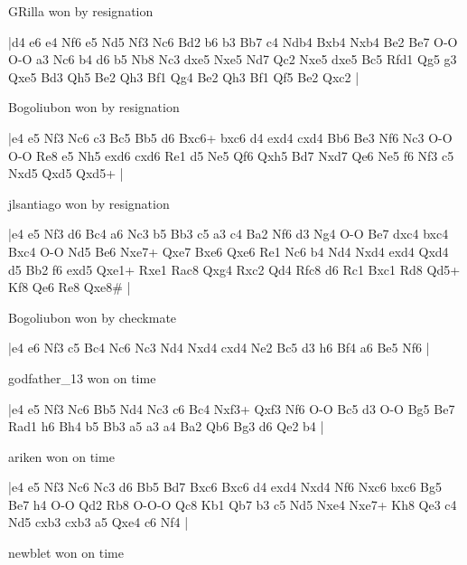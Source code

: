 GRilla won by resignation

\makegametitle
|d4 e6 e4 Nf6 e5 Nd5 Nf3 Nc6 Bd2 b6 b3 Bb7 c4 Ndb4 Bxb4 Nxb4 Be2 Be7 O-O O-O a3 Nc6 b4 d6 b5 Nb8 Nc3 dxe5 Nxe5 Nd7 Qc2 Nxe5 dxe5 Bc5 Rfd1 Qg5 g3 Qxe5 Bd3 Qh5 Be2 Qh3 Bf1 Qg4 Be2 Qh3 Bf1 Qf5 Be2 Qxc2  |

\showboard

Bogoliubon won by resignation

\makegametitle
|e4 e5 Nf3 Nc6 c3 Bc5 Bb5 d6 Bxc6+ bxc6 d4 exd4 cxd4 Bb6 Be3 Nf6 Nc3 O-O O-O Re8 e5 Nh5 exd6 cxd6 Re1 d5 Ne5 Qf6 Qxh5 Bd7 Nxd7 Qe6 Ne5 f6 Nf3 c5 Nxd5 Qxd5 Qxd5+  |

\showboard

jlsantiago won by resignation

\makegametitle
|e4 e5 Nf3 d6 Bc4 a6 Nc3 b5 Bb3 c5 a3 c4 Ba2 Nf6 d3 Ng4 O-O Be7 dxc4 bxc4 Bxc4 O-O Nd5 Be6 Nxe7+ Qxe7 Bxe6 Qxe6 Re1 Nc6 b4 Nd4 Nxd4 exd4 Qxd4 d5 Bb2 f6 exd5 Qxe1+ Rxe1 Rac8 Qxg4 Rxc2 Qd4 Rfc8 d6 Rc1 Bxc1 Rd8 Qd5+ Kf8 Qe6 Re8 Qxe8\#  |

\showboard

Bogoliubon won by checkmate

\makegametitle
|e4 e6 Nf3 c5 Bc4 Nc6 Nc3 Nd4 Nxd4 cxd4 Ne2 Bc5 d3 h6 Bf4 a6 Be5 Nf6  |

\showboard

godfather\_13 won on time

\makegametitle
|e4 e5 Nf3 Nc6 Bb5 Nd4 Nc3 c6 Bc4 Nxf3+ Qxf3 Nf6 O-O Bc5 d3 O-O Bg5 Be7 Rad1 h6 Bh4 b5 Bb3 a5 a3 a4 Ba2 Qb6 Bg3 d6 Qe2 b4  |

\showboard

ariken won on time

\makegametitle
|e4 e5 Nf3 Nc6 Nc3 d6 Bb5 Bd7 Bxc6 Bxc6 d4 exd4 Nxd4 Nf6 Nxc6 bxc6 Bg5 Be7 h4 O-O Qd2 Rb8 O-O-O Qc8 Kb1 Qb7 b3 c5 Nd5 Nxe4 Nxe7+ Kh8 Qe3 c4 Nd5 cxb3 cxb3 a5 Qxe4 c6 Nf4  |

\showboard

newblet won on time

